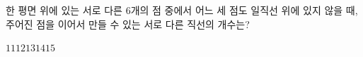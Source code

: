 \hspace*{2mm}\begin{minipage}[t]{\dimexpr\linewidth-2mm\relax}\vspace{0pt}
한 평면 위에 있는 서로 다른 6개의 점 중에서 어느 세 점도 일직선 위에 있지 않을 때, 주어진 점을 이어서 만들 수 있는 서로 다른 직선의 개수는?
\begin{choices32}{$11$}{$12$}{$13$}{$14$}{$15$}\end{choices32}\end{minipage}
